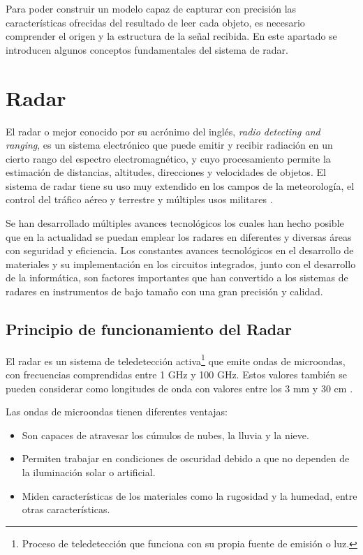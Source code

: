 
Para poder construir un modelo capaz de capturar con precisión las características ofrecidas del resultado de leer cada objeto, es necesario comprender el origen y la estructura de la señal recibida. En este apartado se introducen algunos conceptos fundamentales del sistema de radar.

\section{Radar}

El radar o mejor conocido por su acrónimo del inglés, \textit{radio detecting and ranging}, es un sistema electrónico que puede emitir y recibir radiación en un cierto rango del espectro electromagnético, y cuyo procesamiento permite la estimación de distancias, altitudes, direcciones y velocidades de objetos. El sistema de radar tiene su uso muy extendido en los campos de la meteorología, el control del tráfico aéreo y terrestre y múltiples usos militares \cite{AlonsoCerpa}.

Se han desarrollado múltiples avances tecnológicos los cuales han hecho posible que en la actualidad se puedan emplear los radares en diferentes y diversas áreas con seguridad y eficiencia. Los constantes avances tecnológicos en el desarrollo de materiales y su implementación en los circuitos integrados, junto con el desarrollo de la informática, son factores importantes que han convertido a los sistemas de radares en instrumentos de bajo tamaño con una gran precisión y calidad. 

\subsection{Principio de funcionamiento del Radar}

El radar es un sistema de teledetección activa\footnote{Proceso de teledetección que funciona con su propia fuente de emisión o luz.} que emite ondas de microondas, con frecuencias comprendidas entre 1 GHz y 100 GHz. Estos valores también se pueden considerar como longitudes de onda con valores entre los 3 mm y 30 cm \cite{HerreraG2009}. 

Las ondas de microondas tienen diferentes ventajas:
\begin{itemize}
\item Son capaces de atravesar los cúmulos de nubes, la lluvia y la nieve.
\item Permiten trabajar en condiciones de oscuridad debido a que no dependen de la iluminación solar o artificial.
\item Miden características de los materiales como la rugosidad y la humedad, entre otras características.
\end{itemize} 

